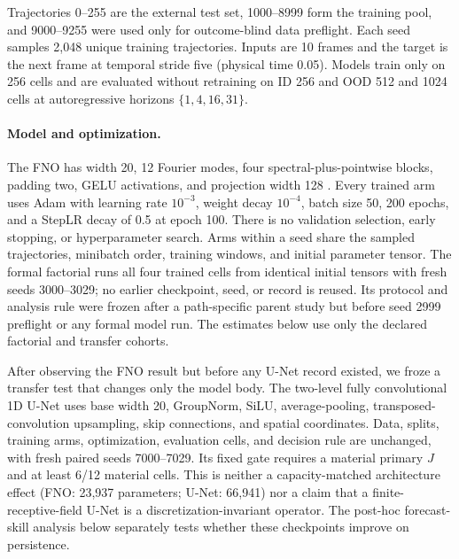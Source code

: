 \documentclass{article}
\begin{document}
Trajectories 0--255 are the external test set, 1000--8999 form the training pool, and 9000--9255
were used only for outcome-blind data preflight. Each seed samples 2,048 unique training
trajectories. Inputs are 10 frames and the target is the next frame at temporal stride five
(physical time 0.05). Models train only on 256 cells and are evaluated without retraining on ID
256 and OOD 512 and 1024 cells at autoregressive horizons $\{1,4,16,31\}$.

\paragraph{Model and optimization.}
The FNO has width 20, 12 Fourier modes, four spectral-plus-pointwise blocks, padding two, GELU
activations, and projection width 128 \citep{li2021fno}. Every trained arm uses Adam with learning
rate $10^{-3}$, weight decay $10^{-4}$, batch size 50, 200 epochs, and a StepLR decay of 0.5 at
epoch 100. There is no validation selection, early stopping, or hyperparameter search. Arms within
a seed share the sampled trajectories, minibatch order, training windows, and initial parameter
tensor. The formal factorial runs all four trained cells from identical initial tensors with fresh
seeds 3000--3029; no earlier checkpoint, seed, or record is reused. Its protocol and analysis rule
were frozen after a path-specific parent study but before seed 2999 preflight or any formal model
run. The estimates below use only the declared factorial and transfer cohorts.

After observing the FNO result but before any U-Net record existed, we froze a transfer test that
changes only the model body. The two-level fully convolutional 1D U-Net
\citep{ronneberger2015unet} uses base width 20, GroupNorm, SiLU, average-pooling, transposed-convolution
upsampling, skip connections, and spatial coordinates. Data, splits, training arms, optimization,
evaluation cells, and decision rule are unchanged, with fresh paired seeds 7000--7029. Its fixed
gate requires a material primary $J$ and at least 6/12 material cells. This is neither a
capacity-matched architecture effect (FNO: 23,937 parameters; U-Net: 66,941) nor a claim that a
finite-receptive-field U-Net is a discretization-invariant operator. The post-hoc forecast-skill
analysis below separately tests whether these checkpoints improve on persistence.
\end{document}
